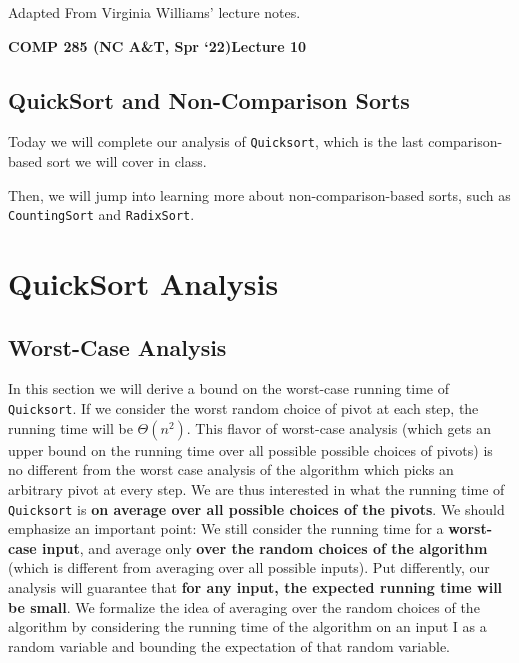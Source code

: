 \documentclass [12pt]{article}
\begin{document}
 

\vspace {1em} 
\begin {Instruction} 
Adapted From Virginia Williams' lecture notes.
\end {Instruction}  

{\LARGE \textbf {COMP 285 (NC A\&T, Spr `22)}\hfill \textbf {Lecture 10} } 

\begin{centering}
\section*{QuickSort and Non-Comparison Sorts}
\end{centering}

Today we will complete our analysis of \texttt{Quicksort}, which is the last comparison-based sort we will cover in class.

Then, we will jump into learning more about non-comparison-based sorts, such as \texttt{CountingSort} and \texttt{RadixSort}.


\section{QuickSort Analysis}
\subsection{Worst-Case Analysis}
In this section we will derive a bound on the worst-case running time of \texttt{Quicksort}. If we
consider the worst random choice of pivot at each step, the running time will be $\Theta(n^2)$. This flavor of worst-case analysis (which gets an upper bound on the running time over all possible possible choices of pivots) is no different from the worst case analysis of the algorithm which picks an arbitrary pivot at every step. We are thus interested in what the running time of \texttt{Quicksort} is \textbf{on average over all possible choices of the pivots}. We should emphasize an important point: We still consider the running time for a \textbf{worst-case input}, and average only \textbf{over the random choices of the algorithm} (which is different from averaging over all possible inputs). Put differently, our analysis will guarantee that \textbf{for any input, the expected running time will be small}. We formalize the idea of averaging over the random choices of the algorithm by considering the running time of the algorithm on an input I as a random variable and bounding the expectation of that random variable.
\end{document}
